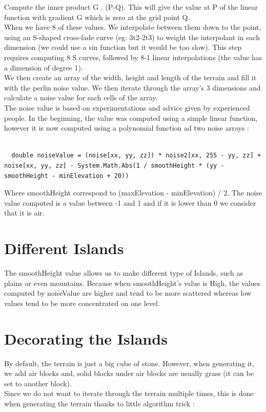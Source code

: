 \documentclass[article]{report}         %
\begin{document}
            Compute the inner product G . (P-Q). This will give the value at P of the linear function with gradient G which is zero at the grid point Q.\\

            When we have 8 of these values. We interpolate between them down to the point, using an S-shaped cross-fade curve (eg: 3t2-2t3) to weight the interpolant in each dimension (we could use a sin function but it would be too slow). This step requires computing 8 S curves, followed by 8-1 linear interpolations (the value has a dimension of degree 1).\\

            We then create an array of the width, height and length of the terrain and fill it with the perlin noise value. We then iterate through the array's 3 dimensions and calculate a noise value for each cells of the array.\\
            The noise value is based on experimentations and advice given by experienced people. In the beginning, the value was computed using a simple linear function, however it is now computed using a polynomial function ad two noise arrays :

            \begin{lstlisting}
              
  double noiseValue = (noise[xx, yy, zz]) * noise2[xx, 255 - yy, zz] + noise[xx, yy, zz] - System.Math.Abs(1 / smoothHeight * (yy - smoothHeight - minElevation + 20))

            \end{lstlisting}

            Where smoothHeight correspond to (maxElevation - minElevation) / 2. The noise value computed is a value between -1 and 1 and if it is lower than 0 we consider that it is air.
      \section{Different Islands}
        The smoothHeight value allows us to make different type of Islands, such as plains or even mountains. Because when smoothHeight's value is High, the values computed by noiseValue are higher and tend to be more scattered whereas low values tend to be more concentrated on one level.

      \section{Decorating the Islands}
        By default, the terrain is just a big cube of stone. However, when generating it, we add air blocks and, solid blocks under air blocks are usually grass (it can be set to another block).\\
        Since we do not want to iterate through the terrain multiple times, this is done when generating the terrain thanks to little algorithm trick :\\
\end{document}
